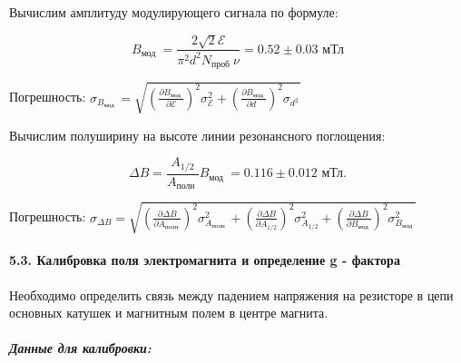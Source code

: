 \documentclass[11pt]{article}
\begin{document}
Вычислим амплитуду модулирующего сигнала по формуле:

\[
B_{\text {мод }}=\frac{2 \sqrt{2} \mathcal{E}}{\pi^{2} d^{2} N_{\text {проб } }  \nu} = 0.52 \pm 0.03 \text{ мТл}
\]

Погрешность:
\(\sigma_{B_{\text {мод }}}=\sqrt{\left(\frac{\partial B_{\text {мод }}}{\partial \mathcal{E}}\right)^{2} \sigma_{\mathcal{E}}^{2}+\left(\frac{\partial B_{\text {мод }}}{\partial d_{\text { }}}\right)^{2} \sigma_{d_{\text { } }^{2}}}\)

Вычислим полуширину на высоте линии резонансного поглощения:

\[
\Delta B=\frac{A_{1 / 2}}{A_{\text {полн }}} B_{\text {мод }} = 0.116 \pm 0.012 \text{ мТл.}
\]

Погрешность:
\(\sigma_{\Delta B}=\sqrt{\left(\frac{\partial \Delta B}{\partial A_{\text {полн }}}\right)^{2} \sigma_{A_{\text {полн }}}^{2}+\left(\frac{\partial \Delta B}{\partial A_{1 / 2}}\right)^{2} \sigma_{A_{1 / 2}}^{2}+\left(\frac{\partial \Delta B}{\partial B_{\text {мод }}}\right)^{2} \sigma_{B_{\text {мод }}}^{2}}\)

    \hypertarget{ux43aux430ux43bux438ux431ux440ux43eux432ux43aux430-ux43fux43eux43bux44f-ux44dux43bux435ux43aux442ux440ux43eux43cux430ux433ux43dux438ux442ux430-ux438-ux43eux43fux440ux435ux434ux435ux43bux435ux43dux438ux435-g---ux444ux430ux43aux442ux43eux440ux430}{%
\paragraph{5.3. Калибровка поля электромагнита и определение g -
фактора}\label{ux43aux430ux43bux438ux431ux440ux43eux432ux43aux430-ux43fux43eux43bux44f-ux44dux43bux435ux43aux442ux440ux43eux43cux430ux433ux43dux438ux442ux430-ux438-ux43eux43fux440ux435ux434ux435ux43bux435ux43dux438ux435-g---ux444ux430ux43aux442ux43eux440ux430}}

Необходимо определить связь между падением напряжения на резисторе в
цепи основных катушек и магнитным полем в центре магнита.

    \hypertarget{ux434ux430ux43dux43dux44bux435-ux434ux43bux44f-ux43aux430ux43bux438ux431ux440ux43eux432ux43aux438}{%
\subparagraph{Данные для
калибровки:}\label{ux434ux430ux43dux43dux44bux435-ux434ux43bux44f-ux43aux430ux43bux438ux431ux440ux43eux432ux43aux438}}
\end{document}
